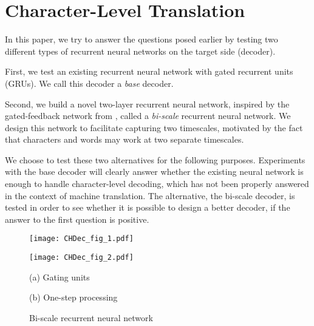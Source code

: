 \documentclass[11pt]{article}
\begin{document}
\section{Character-Level Translation}
\label{sec:char_trans}

In this paper, we try to answer the questions posed earlier by testing two
different types of recurrent neural networks on the target side (decoder).

First, we test an existing recurrent neural network with gated recurrent units
(GRUs). We call this decoder a {\em base} decoder.

Second, we build a novel two-layer recurrent neural network, inspired by the
gated-feedback network from , called a {\em bi-scale}
recurrent neural network. 
We design this network to facilitate capturing two timescales, motivated by the
fact that characters and words may work at two separate timescales.

We choose to test these two alternatives for the following purposes. Experiments
with the base decoder will clearly answer whether the existing neural network is
enough to handle character-level decoding, which has not been properly answered
in the context of machine translation. The alternative, the bi-scale decoder, is
tested in order to see whether it is possible to design a better decoder, if the
answer to the first question is positive.

\begin{figure}
    \begin{minipage}{1.\columnwidth}
        \begin{minipage}{0.46\columnwidth}
            \centering
            \texttt{[image: CHDec\_fig\_1.pdf]}
        \end{minipage}
        \hfill
        \begin{minipage}{0.46\columnwidth}
            \centering
            \texttt{[image: CHDec\_fig\_2.pdf]}
        \end{minipage}
    \end{minipage}
    \begin{minipage}{1.\columnwidth}
        \begin{minipage}{0.48\columnwidth}
            \centering
            (a) Gating units
        \end{minipage}
        \begin{minipage}{0.48\columnwidth}
            \centering
            (b) One-step processing
        \end{minipage}
    \end{minipage}

   
    \caption{Bi-scale recurrent neural network}
    \label{fig:CHDec}

\end{figure}
\end{document}
